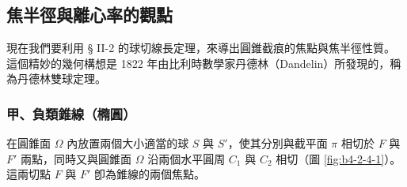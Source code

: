 \subsection{焦半徑與離心率的觀點}
\label{sec:b4-2-4}

現在我們要利用 § II-2 的球切線長定理，來導出圓錐截痕的焦點與焦半徑性質。這個精妙的幾何構想是 1822 年由比利時數學家丹德林（Dandelin）所發現的，稱為丹德林雙球定理。

\subsubsection*{甲、負類錐線（橢圓）}

在圓錐面 $\Omega$ 內放置兩個大小適當的球 $S$ 與 $S'$，使其分別與截平面 $\pi$ 相切於 $F$ 與 $F'$ 兩點，同時又與圓錐面 $\Omega$ 沿兩個水平圓周 $C_1$ 與 $C_2$ 相切（圖 \ref{fig:b4-2-4-1}）。這兩切點 $F$ 與 $F'$ 卽為錐線的兩個焦點。

